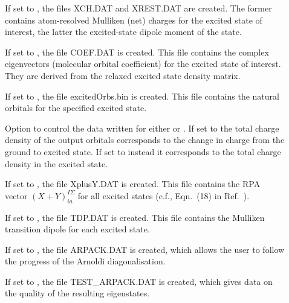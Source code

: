 \begin{description}
  \item[] If set to , the files XCH.DAT and XREST.DAT are created. The
    former contains atom-resolved Mulliken (net) charges for the excited state of interest, the
    latter the excited-state dipole moment of the state.

  \item[] If set to , the file COEF.DAT is created. This file contains
    the complex eigenvectors (molecular orbital coefficient) for the excited state of interest. They
    are derived from the relaxed excited state density matrix.

  \item[] If set to , the file excitedOrbs.bin is created. This file
    contains the natural orbitals for the specified excited state.

  \item[] Option to control the data written for either 
    or . If set to  the total charge density of the output orbitals
    corresponds to the change in charge from the ground to excited state. If set to  instead
    it corresponds to the total charge density in the excited state.

  \item[] If set to , the file XplusY.DAT is created. This file contains the
    RPA vector $(X+Y)^{I\Sigma}_{ia}$ for all excited states (c.f., Eqn.~(18) in
    Ref.~\cite{heringer2007aes}).

  \item[] If set to , the file TDP.DAT is created. This file
    contains the Mulliken transition dipole for each excited state.

  \item[] If set to , the file ARPACK.DAT is created, which allows
    the user to follow the progress of the Arnoldi diagonalisation.

  \item[] If set to , the file TEST\_ARPACK.DAT is created, which gives data
    on the quality of the resulting eigenstates.

  \end{description}

